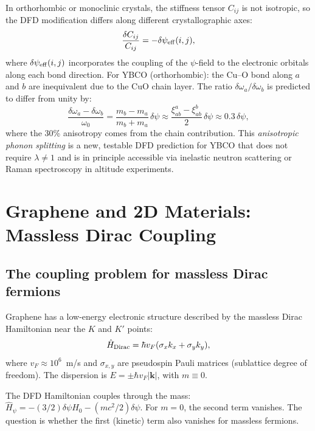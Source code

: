 \documentclass[11pt]{article}
\begin{document}
In orthorhombic or monoclinic crystals, the stiffness tensor $C_{ij}$ is
not isotropic, so the DFD modification differs along different crystallographic
axes:
\begin{equation}
\frac{\delta C_{ij}}{C_{ij}} = -\delta\psi_{\rm eff}(i,j),
\label{eq:Cij-psi}
\end{equation}
where $\delta\psi_{\rm eff}(i,j)$ incorporates the coupling of the
$\psi$-field to the electronic orbitals along each bond direction.
For YBCO (orthorhombic): the Cu--O bond along $a$ and $b$ are inequivalent
due to the CuO chain layer. The ratio $\delta\omega_a/\delta\omega_b$ is
predicted to differ from unity by:
\begin{equation}
\frac{\delta\omega_a - \delta\omega_b}{\omega_0}
= \frac{m_b - m_a}{m_b + m_a}\,\delta\psi
\approx \frac{\xi_{ab}^a - \xi_{ab}^b}{2}\,\delta\psi \approx 0.3\,\delta\psi,
\end{equation}
where the 30\% anisotropy comes from the chain contribution. This
\emph{anisotropic phonon splitting} is a new, testable DFD prediction for
YBCO that does not require $\lambda \neq 1$ and is in principle accessible
via inelastic neutron scattering or Raman spectroscopy in altitude experiments.

\section{Graphene and 2D Materials: Massless Dirac Coupling}
\label{sec:graphene}

\subsection{The coupling problem for massless Dirac fermions}

Graphene has a low-energy electronic structure described by the massless
Dirac Hamiltonian near the $K$ and $K'$ points:
\begin{equation}
\hat{H}_{\rm Dirac} = \hbar v_F(\sigma_x k_x + \sigma_y k_y),
\label{eq:Dirac-graphene}
\end{equation}
where $v_F \approx 10^6$~m/s and $\sigma_{x,y}$ are pseudospin Pauli
matrices (sublattice degree of freedom). The dispersion is
$E = \pm\hbar v_F|\mathbf{k}|$, with $m \equiv 0$.

The DFD Hamiltonian couples through the mass:
$\hat{H}_\psi = -(3/2)\delta\psi\hat{H}_0 - (mc^2/2)\delta\psi$.
For $m = 0$, the second term vanishes. The question is whether the
first (kinetic) term also vanishes for massless fermions.
\end{document}
